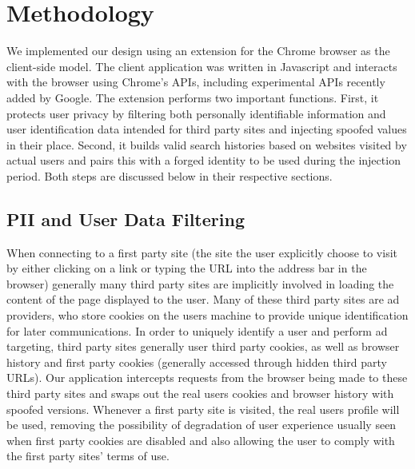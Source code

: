 \documentclass[11pt,twocolumn]{article}
\begin{document}
\section{Methodology}
We implemented our design using an extension for the Chrome browser as the client-side model. The client application was written in Javascript and interacts with the browser using Chrome's APIs, including experimental APIs recently added by Google. The extension performs two important functions. First, it protects user privacy by filtering both personally identifiable information and user identification data intended for third party sites and injecting spoofed values in their place. Second, it builds valid search histories based on websites visited by actual users and pairs this with a forged identity to be used during the injection period. Both steps are discussed below in their respective sections.

\subsection{PII and User Data Filtering}
When connecting to a first party site (the site the user explicitly choose to visit by either clicking on a link or typing the URL into the address bar in the browser) generally many third party sites are implicitly involved in loading the content of the page displayed to the user. Many of these third party sites are ad providers, who store cookies on the users machine to provide unique identification for later communications. In order to uniquely identify a user and perform ad targeting, third party sites generally user third party cookies, as well as browser history and first party cookies (generally accessed through hidden third party URLs). Our application intercepts requests from the browser being made to these third party sites and swaps out the real users cookies and browser history with spoofed versions. Whenever a first party site is visited, the real users profile will be used, removing the possibility of degradation of user experience usually seen when first party cookies are disabled and also allowing the user to comply with the first party sites' terms of use.
\end{document}
